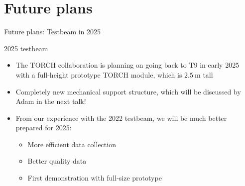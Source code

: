 \documentclass[xcolor={dvipsnames}]{beamer}
\begin{document}
\section{Future plans}

\begin{frame}{Future plans: Testbeam in 2025}
  \begin{center}
    {\Large 2025 testbeam}
  \end{center}
  \begin{itemize}
    \setlength\itemsep{1.0em}
    \item{The TORCH collaboration is planning on going back to T9 in early 2025 with a full-height prototype TORCH module, which is $\SI{2.5}{\meter}$ tall}
    \item{Completely new mechanical support structure, which will be discussed by Adam in the next talk!}
    \item{From our experience with the 2022 testbeam, we will be much better prepared for 2025:}
    \begin{itemize}
      \item{More efficient data collection}
      \item{Better quality data}
      \item{First demonstration with full-size prototype}
    \end{itemize}
  \end{itemize}
\end{frame}
\end{document}
